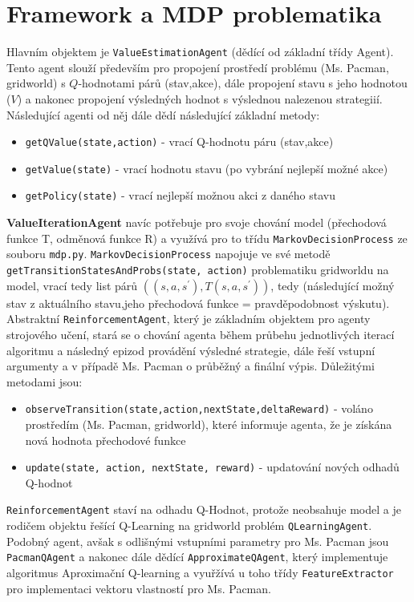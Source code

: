 \section{Framework a MDP problematika}
Hlavním objektem je \texttt{ValueEstimationAgent} (dědící od základní třídy Agent). Tento agent slouží především pro propojení prostředí problému (Ms. Pacman, gridworld) s $Q$-hodnotami párů (stav,akce), dále propojení stavu s jeho hodnotou ($V$) a nakonec propojení výsledných hodnot s výslednou nalezenou strategiií.
Následující agenti od něj dále dědí následující základní metody:
\begin{itemize}
\item \texttt{getQValue(state,action)} - vrací Q-hodnotu páru (stav,akce)
\item \texttt{getValue(state)} - vrací hodnotu stavu (po vybrání nejlepší možné akce)
\item \texttt{getPolicy(state)} - vrací nejlepší možnou akci z daného stavu
\end{itemize}
\textbf{ValueIterationAgent} navíc potřebuje pro svoje chování model (přechodová funkce T, odměnová funkce R) a využívá pro to třídu \texttt{MarkovDecisionProcess} ze souboru \texttt{mdp.py}. \texttt{MarkovDecisionProcess} napojuje ve své metodě \texttt{getTransitionStatesAndProbs(state, action)} problematiku gridworldu na model, vrací tedy list párů $((s,a,s^\prime),T(s,a,s^\prime))$, tedy (následující možný stav z aktuálního stavu,jeho přechodová funkce = pravděpodobnost výskutu).
\newline
Abstraktní \texttt{ReinforcementAgent}, který je základním objektem pro agenty strojového učení, stará se o chování agenta během průbehu jednotlivých iterací algoritmu a následný epizod provádění výsledné strategie, dále řeší vstupní argumenty a v případě Ms. Pacman o průběžný a finální výpis. Důležitými metodami jsou:
\begin{itemize}
\item \texttt{observeTransition(state,action,nextState,deltaReward)} - voláno prostředím (Ms. Pacman, gridworld), které informuje agenta, že je získána nová hodnota přechodové funkce
\item \texttt{update(state, action, nextState, reward)} - updatování nových odhadů Q-hodnot
\end{itemize}
\texttt{ReinforcementAgent} staví na odhadu Q-Hodnot, protože neobsahuje model a je rodičem objektu řešící Q-Learning na gridworld problém \texttt{QLearningAgent}. Podobný agent, avšak s odlišnými vstupními parametry pro Ms. Pacman jsou \texttt{PacmanQAgent} a nakonec dále dědící \texttt{ApproximateQAgent}, který implementuje algoritmus Aproximační Q-learning a vyuřžívá u toho třídy \texttt{FeatureExtractor} pro implementaci vektoru vlastností pro Ms. Pacman.

